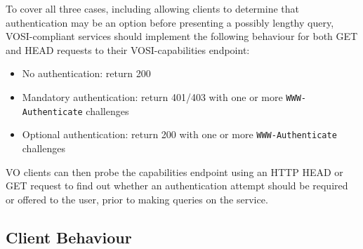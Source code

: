 \documentclass[11pt,a4paper]{ivoa}
\newcommand{\header}[1]{{\tt #1}}
\begin{document}
To cover all three cases,
including allowing clients to determine that authentication may be an
option before presenting a possibly lengthy query,
VOSI-compliant services should implement the following behaviour
for both GET and HEAD requests to their VOSI-capabilities endpoint:
\begin{itemize}
  \item No authentication:
        return 200
  \item Mandatory authentication:
        return 401/403 with one or more \header{WWW-Authenticate} challenges
  \item Optional authentication:
        return 200 with one or more \header{WWW-Authenticate} challenges
\end{itemize}
VO clients can then probe the capabilities endpoint using an HTTP HEAD
or GET request to find out whether an authentication attempt should be
required or offered to the user, prior to making queries on the service.

\subsection{Client Behaviour}
\end{document}

